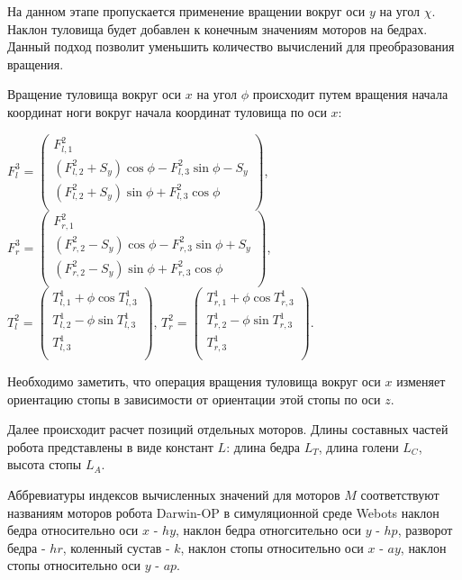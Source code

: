 На данном этапе пропускается применение вращении вокруг оси $y$ на угол $\chi$. Наклон туловища будет добавлен к конечным значениям моторов на бедрах. Данный подход позволит уменьшить количество вычислений для преобразования вращения.

Вращение туловища вокруг оси $x$ на угол $\phi$ происходит путем вращения начала координат ноги вокруг начала координат туловища по оси $x$:

\begin{center}
$F^{3}_{l} = \begin{pmatrix}
F^{2}_{l,1} \\
(F^{2}_{l,2} + S_{y}) \cos \phi - F^{2}_{l,3} \sin \phi - S_{y} \\
(F^{2}_{l,2} + S_{y}) \sin \phi + F^{2}_{l,3} \cos \phi \\
\end{pmatrix}$, $F^{3}_{r} = \begin{pmatrix}
F^{2}_{r,1} \\
(F^{2}_{r,2} - S_{y}) \cos \phi - F^{2}_{r,3} \sin \phi + S_{y} \\
(F^{2}_{r,2} - S_{y}) \sin \phi + F^{2}_{r,3} \cos \phi \\
\end{pmatrix}$,\\
$T^{2}_{l} = \begin{pmatrix}
T^{1}_{l,1} + \phi \cos T^{1}_{l,3} \\
T^{1}_{l,2} - \phi \sin T^{1}_{l,3} \\
T^{1}_{l,3} \\
\end{pmatrix}$,
$T^{2}_{r} = \begin{pmatrix}
T^{1}_{r,1} + \phi \cos T^{1}_{r,3}  \\
T^{1}_{r,2} - \phi \sin T^{1}_{r,3}  \\
T^{1}_{r,3} \\
\end{pmatrix}$.
\end{center}

Необходимо заметить, что операция вращения туловища вокруг оси $x$ изменяет ориентацию стопы в зависимости от ориентации этой стопы по оси $z$.

Далее происходит расчет позиций отдельных моторов. Длины составных частей робота представлены в виде констант $L$: длина бедра $L_{T}$, длина голени $L_{C}$, высота стопы $L_{A}$.

Аббревиатуры индексов вычисленных значений для моторов $M$ соответствуют названиям моторов робота Darwin-OP в симуляционной среде Webots\cite{fabien2013webots} наклон бедра относительно оси $x$ - $hy$, наклон бедра отногсительно оси $y$ - $hp$, разворот бедра - $hr$, коленный сустав - $k$, наклон стопы относительно оси $x$ - $ay$, наклон стопы относительно оси $y$ - $ap$.

